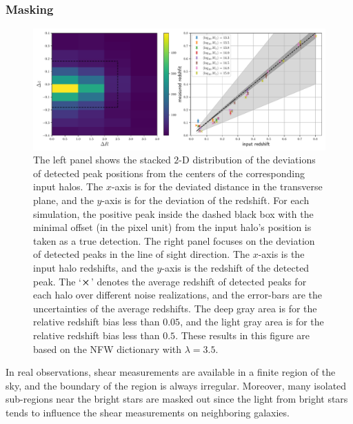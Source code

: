 \documentclass[twocolumn]{aastex62}
\begin{document}
\subsubsection{Masking}
\label{subsec:method-msknoise}

\begin{figure}[!t]
 \centering
 \includegraphics[width=1.0\textwidth]{peak_scatters_f3-1.pdf}
 \caption{The left panel shows the stacked $2$-D distribution of the deviations
     of detected peak positions from the centers of the corresponding input
     halos. The $x$-axis is for the deviated distance in the transverse plane,
     and the $y$-axis is for the deviation of the redshift. For each
     simulation, the positive peak inside the dashed black box with the
     minimal offset (in the pixel unit) from the input halo's position is
     taken as a true detection. The right panel focuses on the deviation of
     detected peaks in the line of sight direction. The $x$-axis is the input
     halo redshifts, and the $y$-axis is the redshift of the detected peak. The
     `$\cross$' denotes the average redshift of detected peaks for each halo
     over different noise realizations, and the error-bars are the
     uncertainties of the average redshifts. The deep gray area is for the
     relative redshift bias less than $0.05$, and the light gray area is for
     the relative redshift bias less than $0.5$. These results in this figure
     are based on the NFW dictionary with $\lambda=3.5$.
     } \label{fig_detoffsets}
\end{figure}

In real observations, shear measurements are available in a finite region of
the sky, and the boundary of the region is always irregular. Moreover, many
isolated sub-regions near the bright stars are masked out since the light from
bright stars tends to influence the shear measurements on neighboring galaxies.
\end{document}
